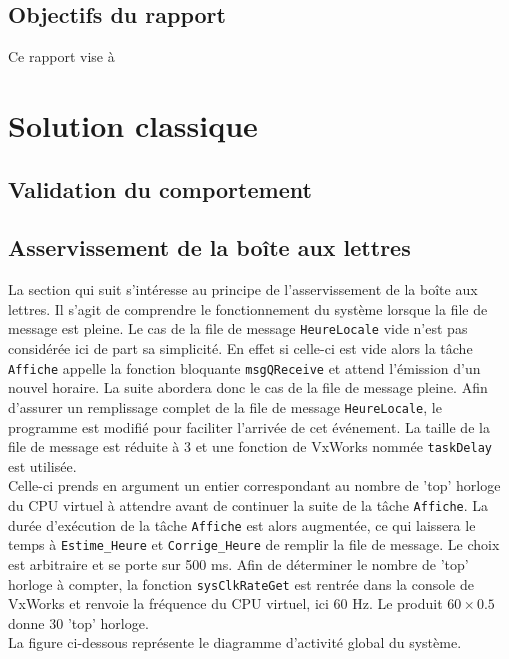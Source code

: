 \documentclass[french]{article}
\begin{document}
	
	\subsection{Objectifs du rapport}
	Ce rapport vise à 
	
	\newpage
	
	
	\section{Solution classique}
	\subsection{Validation du comportement}
	
	\subsection{Asservissement de la boîte aux lettres}	
	
	La section qui suit s'intéresse au principe de l'asservissement de la boîte aux lettres. Il s'agit de comprendre le fonctionnement du système lorsque la file de message est pleine. Le cas de la file de message \texttt{HeureLocale} vide n'est pas considérée ici de part sa simplicité. En effet si celle-ci est vide alors la tâche \texttt{Affiche} appelle la fonction bloquante \texttt{msgQReceive} et attend l'émission d'un nouvel horaire. La suite abordera donc le cas de la file de message pleine. Afin d'assurer un remplissage complet de la file de message \texttt{HeureLocale}, le programme est modifié pour faciliter l'arrivée de cet événement. La taille de la file de message est réduite à 3 et une fonction de VxWorks nommée \texttt{taskDelay} est utilisée.\\
	Celle-ci prends en argument un entier correspondant au nombre de 'top' horloge du CPU virtuel à attendre avant de continuer la suite de la tâche \texttt{Affiche}. La durée d'exécution de la tâche \texttt{Affiche} est alors augmentée, ce qui laissera le temps à \texttt{Estime\_Heure} et \texttt{Corrige\_Heure} de remplir la file de message. Le choix est arbitraire et se porte sur 500 ms. Afin de déterminer le nombre de 'top' horloge à compter, la fonction \texttt{sysClkRateGet} est rentrée dans la console de VxWorks et renvoie la fréquence du CPU virtuel, ici 60 Hz. Le produit $60\times0.5$ donne 30 'top' horloge.\\
	La figure ci-dessous représente le diagramme d'activité global du système.
	
\end{document}
